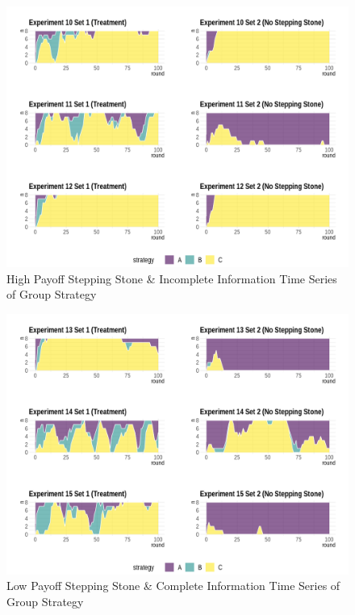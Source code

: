 \begin{figure}[h]
\captionsetup{justification=centering}
  \caption{High Payoff Stepping Stone \& Incomplete Information Time Series of Group Strategy}
   \label{fig:Series2I}
    \includegraphics[width = \textwidth]{Images/AllAreaPlot2I.png}
    
\end{figure}

\begin{figure}[h]
\captionsetup{justification=centering}
  \caption{Low Payoff Stepping Stone \& Complete Information Time Series of Group Strategy}
   \label{fig:Series3C}
    \includegraphics[width = \textwidth]{Images/AllAreaPlot3C.png}
    
\end{figure}

